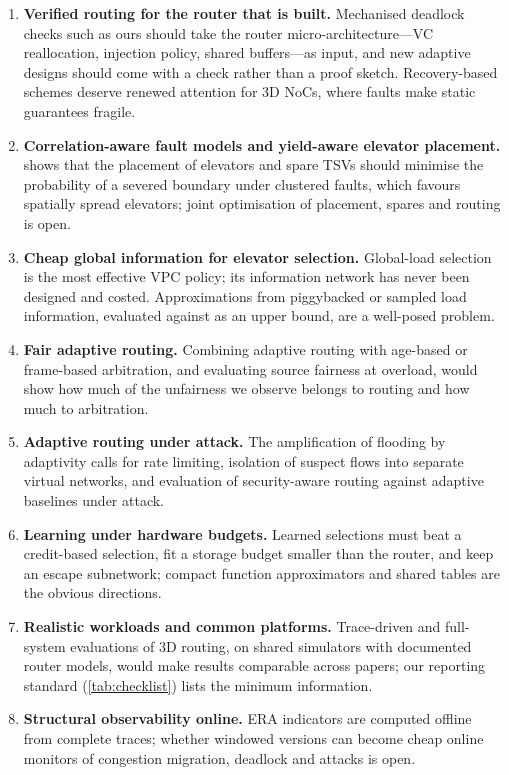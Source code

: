 \begin{enumerate}[label=\textbf{A\arabic*.},leftmargin=*,itemsep=2pt]
\item \textbf{Verified routing for the router that is built.} Mechanised deadlock checks such as ours should take the router micro-architecture---VC reallocation, injection policy, shared buffers---as input, and new adaptive designs should come with a check rather than a proof sketch. Recovery-based schemes deserve renewed attention for 3D NoCs, where faults make static guarantees fragile.
\item \textbf{Correlation-aware fault models and yield-aware elevator placement.}  shows that the placement of elevators and spare TSVs should minimise the probability of a severed boundary under clustered faults, which favours spatially spread elevators; joint optimisation of placement, spares and routing is open.
\item \textbf{Cheap global information for elevator selection.} Global-load selection is the most effective VPC policy; its information network has never been designed and costed. Approximations from piggybacked or sampled load information, evaluated against  as an upper bound, are a well-posed problem.
\item \textbf{Fair adaptive routing.} Combining adaptive routing with age-based or frame-based arbitration, and evaluating source fairness at overload, would show how much of the unfairness we observe belongs to routing and how much to arbitration.
\item \textbf{Adaptive routing under attack.} The amplification of flooding by adaptivity calls for rate limiting, isolation of suspect flows into separate virtual networks, and evaluation of security-aware routing against adaptive baselines under attack.
\item \textbf{Learning under hardware budgets.} Learned selections must beat a credit-based selection, fit a storage budget smaller than the router, and keep an escape subnetwork; compact function approximators and shared tables are the obvious directions.
\item \textbf{Realistic workloads and common platforms.} Trace-driven and full-system evaluations of 3D routing, on shared simulators with documented router models, would make results comparable across papers; our reporting standard (\cref{tab:checklist}) lists the minimum information.
\item \textbf{Structural observability online.} ERA indicators are computed offline from complete traces; whether windowed versions can become cheap online monitors of congestion migration, deadlock and attacks is open.
\end{enumerate}

